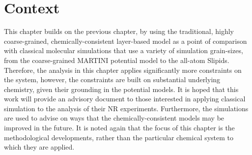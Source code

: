 \section*{Context}
This chapter builds on the previous chapter, by using the traditional, highly coarse-grained, chemically-consistent layer-based model as a point of comparison with classical molecular simulations that use a variety of simulation grain-sizes, from the coarse-grained MARTINI potential model to the all-atom Slipids.
Therefore, the analysis in this chapter applies significantly more constraints on the system, however, the constraints are built on substantial underlying chemistry, given their grounding in the potential models.
It is hoped that this work will provide an advisory document to those interested in applying classical simulation to the analysis of their NR experiments.
Furthermore, the simulations are used to advise on ways that the chemically-consistent models may be improved in the future.
It is noted again that the focus of this chapter is the methodological developments, rather than the particular chemical system to which they are applied.
